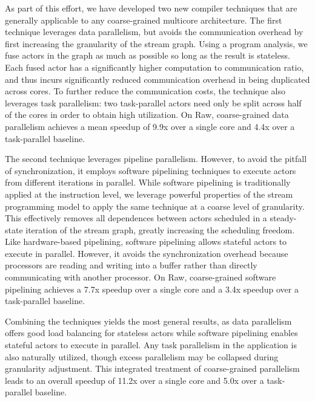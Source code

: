 As part of this effort, we have developed two new compiler techniques
that are generally applicable to any coarse-grained multicore
architecture.  The first technique leverages data parallelism, but
avoids the communication overhead by first increasing the granularity
of the stream graph.  Using a program analysis, we fuse actors in the
graph as much as possible so long as the result is stateless.  Each
fused actor has a significantly higher computation to communication
ratio, and thus incurs significantly reduced communication overhead in
being duplicated across cores.  To further reduce the communication
costs, the technique also leverages task parallelism: two
task-parallel actors need only be split across half of the cores in
order to obtain high utilization.  On Raw, coarse-grained data
parallelism achieves a mean speedup of 9.9x over a single core and
4.4x over a task-parallel baseline.

The second technique leverages pipeline parallelism.  However, to
avoid the pitfall of synchronization, it employs software pipelining
techniques to execute actors from different iterations in parallel.
While software pipelining is traditionally applied at the instruction
level, we leverage powerful properties of the stream programming model
to apply the same technique at a coarse level of granularity.  This
effectively removes all dependences between actors scheduled in a
steady-state iteration of the stream graph, greatly increasing the
scheduling freedom.  Like hardware-based pipelining, software
pipelining allows stateful actors to execute in parallel.
However, it avoids the synchronization overhead because processors are
reading and writing into a buffer rather than directly communicating
with another processor.  On Raw, coarse-grained software pipelining
achieves a 7.7x speedup over a single core and a 3.4x speedup over a
task-parallel baseline.

Combining the techniques yields the most general results, as data
parallelism offers good load balancing for stateless actors while
software pipelining enables stateful actors to execute in parallel.
Any task parallelism in the application is also naturally utilized,
though excess parallelism may be collapsed during granularity
adjustment.  This integrated treatment of coarse-grained parallelism
leads to an overall speedup of 11.2x over a single core and 5.0x over
a task-parallel baseline.


